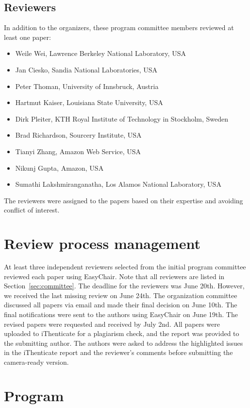 \documentclass{article}
\begin{document}
\subsection{Reviewers}
In addition to the organizers, these program committee members reviewed at least one paper:
\begin{itemize}
  \item Weile Wei, Lawrence Berkeley National Laboratory, USA
   \item Jan Ciesko, Sandia National Laboratories, USA
    \item Peter Thoman, University of Innsbruck, Austria
     \item Hartmut Kaiser, Louisiana State University, USA
    \item Dirk Pleiter, KTH Royal Institute of Technology in Stockholm, Sweden
    \item Brad Richardson, Sourcery Institute, USA
 \item Tianyi Zhang, Amazon Web Service, USA
 \item Nikunj Gupta, Amazon, USA
  \item Sumathi Lakshmiranganatha, Los Alamos National Laboratory, USA
\end{itemize}
The reviewers were assigned to the papers based on their expertise and avoiding conflict of interest. 


\section{Review process management}
At least three independent reviewers selected from the initial program committee reviewed each paper using EasyChair. Note that all reviewers are listed in Section~\ref{sec:committee}. The deadline for the reviewers was June 20th. However, we received the last missing review on June 24th. The organization committee discussed all papers via email and made their final decision on June 10th. The final notifications were sent to the authors using EasyChair on June 19th. The revised papers were requested and received by July 2nd. All papers were uploaded to iThenticate for a plagiarism check, and the report was provided to the submitting author. The authors were asked to address the highlighted issues in the iThenticate report and the reviewer’s comments before submitting the camera-ready version. 


\section{Program}
\end{document}
